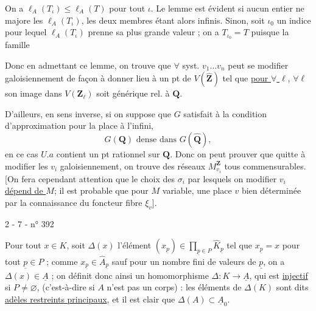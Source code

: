On a $\ell_A(T_\iota)\leq\ell_A(T)$ pour tout $\iota$. Le lemme est évident si aucun entier ne majore les $\ell_A(T_\iota)$, les deux membres étant alors infinis. Sinon, soit $\iota_0$ un indice pour lequel $\ell_A(T_\iota)$ prenne sa plus grande valeur ; on a $T_{\iota_0}=T$ puisque la famille

Donc en admettant ce lemme, on trouve que $\forall$ syst. $v_1\ldots v_n$ peut se modifier galoisiennement de façon à donner lieu à un pt  de $V(\widehat{\mathbf Z})$  tel que \uline{pour $\forall$ $\ell$}, $\forall\ell$ son image dans $V(\mathbf Z_\ell)$ soit générique rel. à $\mathbf Q$.

D'ailleurs, en sens inverse, si on suppose que $G$ satisfait à la condition d'approximation pour la place à l'infini,
\[
 G(\mathbf Q)\text{ dense dans }G(\widehat{\mathbf Q}),
\]
en ce cas  $U.a$ contient un pt rationnel sur $\mathbf Q$. Donc on peut prouver que quitte à modifier les $v_i$ galoisiennement, on trouve des réseaux $M_{v_i}^{\mathbf Z}$ tous commensurables. [On fera cependant attention que le choix des $\sigma_i$ par lesquels on  modifier $v_i$ \uline{dépend de $M$}; il est probable que pour $M$ variable, une place $v$  bien déterminée par la connaissance du foncteur fibre $\xi_v$].


2 - 7 - \hfill n° 392

Pour tout $x\in K$, soit $\Delta(x)$ l'élément $(x_{\underline p})\in\prod_{\underline p\in P}\hat K_{\underline p}$ tel que $x_{\underline p}=x$ pour tout $\underline p\in P$ ; comme $x_{\underline p}\in\hat A_{\underline p}$ sauf pour un nombre fini de valeurs de $\underline p$, on a $\Delta(x)\in\underline A$ ; on définit donc ainsi un homomorphisme $\Delta:K\longrightarrow\underline A$, qui est \uline{injectif} si $P\ne\varnothing$, (c'est-à-dire si $A$ n'est pas un corps) : les éléments de $\Delta(K)$ sont dits \uline{adèles restreints principaux}, et il est clair que $\Delta(A)\subset\underline A_0$.

